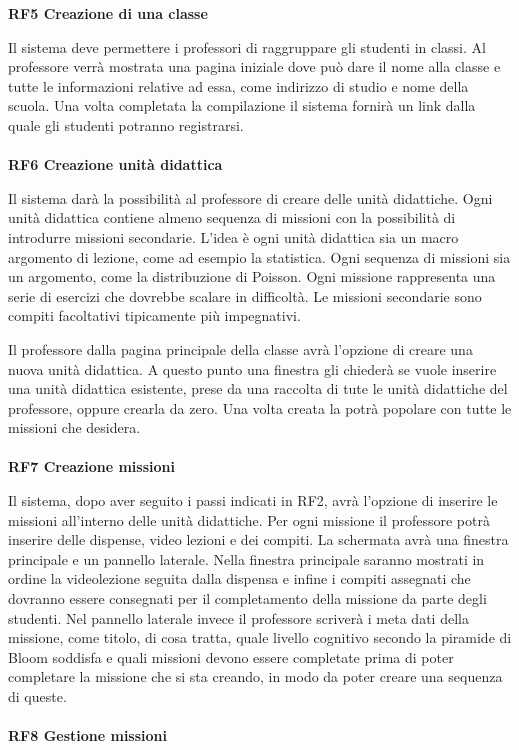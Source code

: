 \textbf{RF5 Creazione di una classe}

Il sistema deve permettere i professori di raggruppare gli studenti in classi. Al professore verrà mostrata una pagina iniziale dove può dare il nome alla classe e tutte le informazioni relative ad essa, come indirizzo di studio e nome della scuola. Una volta completata la compilazione il sistema fornirà un link dalla quale gli studenti potranno registrarsi.\\
\\
\textbf{RF6 Creazione unità didattica}

Il sistema darà la possibilità al professore di creare delle unità didattiche. Ogni unità didattica contiene almeno sequenza di missioni con la possibilità di introdurre missioni secondarie. L'idea è ogni unità didattica sia un macro argomento di lezione, come ad esempio la statistica. Ogni sequenza di missioni sia un argomento, come la distribuzione di Poisson. Ogni missione rappresenta una serie di esercizi che dovrebbe scalare in difficoltà. Le missioni secondarie sono compiti facoltativi tipicamente più impegnativi.

Il professore dalla pagina principale della classe avrà l'opzione di creare una nuova unità didattica. A questo punto una finestra gli chiederà se vuole inserire una unità didattica esistente, prese da una raccolta di tute le unità didattiche del professore, oppure crearla da zero. Una volta creata la potrà popolare con tutte le missioni che desidera.\\
\\
\textbf{RF7 Creazione missioni}

Il sistema, dopo aver seguito i passi indicati in RF2, avrà l'opzione di inserire le missioni all'interno delle unità didattiche. Per ogni missione il professore potrà inserire delle dispense, video lezioni e dei compiti. La schermata avrà una finestra principale e un pannello laterale. Nella finestra principale saranno mostrati in ordine la videolezione seguita dalla dispensa e infine i compiti assegnati che dovranno essere consegnati per il completamento della missione da parte degli studenti. Nel pannello laterale invece il professore scriverà i meta dati della missione, come titolo, di cosa tratta, quale livello cognitivo secondo la piramide di Bloom soddisfa e quali missioni devono essere completate prima di poter completare la missione che si sta creando, in modo da poter creare una sequenza di queste.\\
\\
\textbf{RF8 Gestione missioni}

